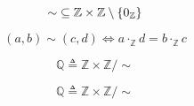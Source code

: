 \begin{frame}{}
  \begin{definition}
    \[
      \sim\; \subseteq \mathbb{Z} \times \mathbb{Z} \setminus \{0_{\mathbb{Z}}\}
    \]

    \[
      (a, b) \sim (c, d) \iff a \cdot_{\mathbb{Z}} d = b \cdot_{\mathbb{Z}} c
    \]
  \end{definition}

  \pause
  \vspace{0.30cm}
  \begin{definition}[$\mathbb{Q}$]
    \[
      \mathbb{Q} \triangleq \mathbb{Z} \times \mathbb{Z}/\sim
    \]
  \end{definition}
\end{frame}

\begin{frame}{}
  \[
    \mathbb{Q} \triangleq \mathbb{Z} \times \mathbb{Z}/\sim
  \]
\end{frame}

\begin{frame}{}
  \begin{center}
  \end{center}

  \pause
\end{frame}
